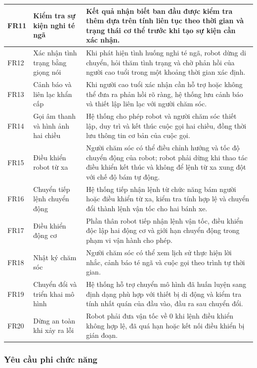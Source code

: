 \begin{longtable}{|p{1.2cm}|p{4.0cm}|p{8.1cm}|}
\hline
FR11 & Kiểm tra sự kiện nghi té ngã & Kết quả nhận biết ban đầu được kiểm tra thêm dựa trên tính liên tục theo thời gian và trạng thái cơ thể trước khi tạo sự kiện cần xác nhận. \\
\hline
FR12 & Xác nhận tình trạng bằng giọng nói & Khi phát hiện tình huống nghi té ngã, robot dừng di chuyển, hỏi thăm tình trạng và chờ phản hồi của người cao tuổi trong một khoảng thời gian xác định. \\
\hline
FR13 & Cảnh báo và liên lạc khẩn cấp & Khi người cao tuổi xác nhận cần hỗ trợ hoặc không thể đưa ra phản hồi rõ ràng, hệ thống lưu cảnh báo và thiết lập liên lạc với người chăm sóc. \\
\hline
FR14 & Gọi âm thanh và hình ảnh hai chiều & Hệ thống cho phép robot và người chăm sóc thiết lập, duy trì và kết thúc cuộc gọi hai chiều, đồng thời lưu thông tin cơ bản của cuộc gọi. \\
\hline
FR15 & Điều khiển robot từ xa & Người chăm sóc có thể điều chỉnh hướng và tốc độ chuyển động của robot; robot phải dừng khi thao tác điều khiển kết thúc và không để lệnh từ xa xung đột với chế độ bám tự động. \\
\hline
FR16 & Chuyển tiếp lệnh chuyển động & Hệ thống tiếp nhận lệnh từ chức năng bám người hoặc điều khiển từ xa, kiểm tra tính hợp lệ và chuyển đổi thành lệnh vận tốc cho hai bánh xe. \\
\hline
FR17 & Điều khiển động cơ & Phần thân robot tiếp nhận lệnh vận tốc, điều khiển độc lập hai động cơ và giới hạn chuyển động trong phạm vi vận hành cho phép. \\
\hline
FR18 & Nhật ký chăm sóc & Người chăm sóc có thể xem lịch sử thực hiện lời nhắc, cảnh báo té ngã và cuộc gọi theo trình tự thời gian. \\
\hline
FR19 & Chuyển đổi và triển khai mô hình & Hệ thống hỗ trợ chuyển mô hình đã huấn luyện sang định dạng phù hợp với thiết bị di động và kiểm tra tính nhất quán của đầu vào, đầu ra sau chuyển đổi. \\
\hline
FR20 & Dừng an toàn khi xảy ra lỗi & Robot phải đưa vận tốc về 0 khi lệnh điều khiển không hợp lệ, đã quá hạn hoặc kết nối điều khiển bị gián đoạn. \\
\hline
\end{longtable}

\subsubsection{Yêu cầu phi chức năng}

